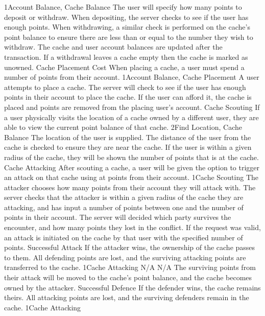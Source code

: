 			{1}{Account Balance, Cache Balance}
			{The user will specify how many points to deposit or withdraw.}
			{When depositing, the server checks to see if the user has enough points. When withdrawing, a similar check is performed on the cache's point balance to ensure there are less than or equal to the number they wish to withdraw.}
			{The cache and user account balances are updated after the transaction. If a withdrawal leaves a cache empty then the cache is marked as unowned.}
		\funcreq
			{Cache Placement Cost}
			{When placing a cache, a user must spend a number of points from their account.}
			{1}{Account Balance, Cache Placement}
			{A user attempts to place a cache.}
			{The server will check to see if the user has enough points in their account to place the cache.}
			{If the user can afford it, the cache is placed and points are removed from the placing user's account.}
		\funcreq
			{Cache Scouting}
			{If a user physically visits the location of a cache owned by a different user, they are able to view the current point balance of that cache.}
			{2}{Find Location, Cache Balance}
			{The location of the user is supplied.}
			{The distance of the user from the cache is checked to ensure they are near the cache.}
			{If the user is within a given radius of the cache, they will be shown the number of points that is at the cache.}
		\funcreq
			{Cache Attacking}
			{After scouting a cache, a user will be given the option to trigger an attack on that cache using at points from their account.}
			{1}{Cache Scouting}
			{The attacker chooses how many points from their account they will attack with.}
			{The server checks that the attacker is within a given radius of the cache they are attacking, and has input a number of points between one and the number of points in their account. The server will decided which party survives the encounter, and how many points they lost in the conflict.}
			{If the request was valid, an attack is initiated on the cache by that user with the specified number of points.}
		\funcreq
			{Successful Attack}
			{If the attacker wins, the ownership of the cache passes to them. All defending points are lost, and the surviving attacking points are transferred to the cache.}
			{1}{Cache Attacking}
			{N/A}
			{N/A}
			{The surviving points from their attack will be moved to the cache's point balance, and the cache becomes owned by the attacker.}
		\funcreq
			{Successful Defence}
			{If the defender wins, the cache remains theirs. All attacking points are lost, and the surviving defenders remain in the cache.}
			{1}{Cache Attacking}

